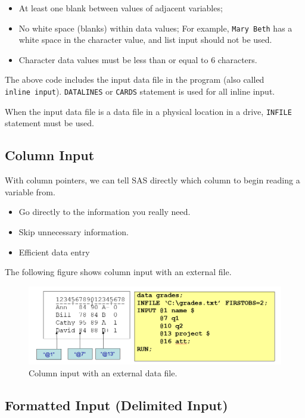 \documentclass[
]{book}
\providecommand{\tightlist}{%
  \setlength{\itemsep}{0pt}\setlength{\parskip}{0pt}}
\begin{document}
\begin{itemize}
\item
  At least one blank between values of adjacent variables;
\item
  No white space (blanks) within data values; For example, \texttt{Mary\ Beth} has a white space in the character value, and list input should not be used.
\item
  Character data values must be less than or equal to 6 characters.
\end{itemize}

The above code includes the input data file in the program (also called \texttt{inline\ input}). \texttt{DATALINES} or \texttt{CARDS} statement is used for all inline input.

When the input data file is a data file in a physical location in a drive, \texttt{INFILE} statement must be used.

\hypertarget{column-input}{%
\subsection{Column Input}\label{column-input}}

With column pointers, we can tell SAS directly which column to begin reading a variable from.

\begin{itemize}
\tightlist
\item
  Go directly to the information you really need.
\item
  Skip unnecessary information.
\item
  Efficient data entry
\end{itemize}

The following figure shows column input with an external file.

\begin{figure}

{\centering \includegraphics[width=0.6\linewidth]{img03/w03-ColumnInput} 

}

\caption{Column input with an external data file.}\label{fig:unnamed-chunk-16}
\end{figure}

\hypertarget{formatted-input-delimited-input}{%
\subsection{Formatted Input (Delimited Input)}\label{formatted-input-delimited-input}}
\end{document}
